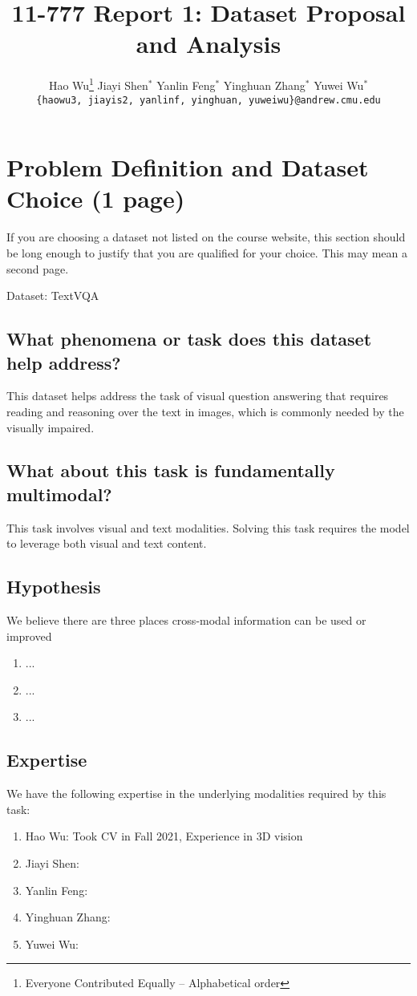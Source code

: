 \documentclass[11pt,a4paper]{article}
\title{11-777 Report 1: Dataset Proposal and Analysis}
\author{
  Hao Wu\thanks{\hspace{4pt}Everyone Contributed Equally -- Alphabetical order} \hspace{2em} Jiayi Shen$^*$ \hspace{2em} Yanlin Feng$^*$ \hspace{2em} Yinghuan Zhang$^*$ \hspace{2em} Yuwei Wu$^*$\\
  \texttt{\{haowu3, jiayis2, yanlinf, yinghuan, yuweiwu\}@andrew.cmu.edu}
  }
\date{}
\begin{document}
\maketitle

\section{Problem Definition and Dataset Choice (1 page)}
If you are choosing a dataset not listed on the course website, this section should be long enough to justify that you are qualified for your choice.  This may mean a second page.

Dataset: TextVQA


\subsection{What phenomena or task does this dataset help address?}
This dataset helps address the task of visual question answering that requires reading and reasoning over the text in images, which is commonly needed by the visually impaired.
\subsection{What about this task is fundamentally multimodal?}
This task involves visual and text modalities. Solving this task requires the model to leverage both visual and text content. 
\subsection{Hypothesis}
We believe there are three places cross-modal information can be used or improved
  \begin{enumerate}
    \item ...
    \item ...
    \item ...
  \end{enumerate}
\subsection{Expertise}
We have the following expertise in the underlying modalities required by this task:
  \begin{enumerate}
      \item Hao Wu: Took CV in Fall 2021, Experience in 3D vision
      \item Jiayi Shen: 
      \item Yanlin Feng: 
      \item Yinghuan Zhang:
      \item Yuwei Wu:
  \end{enumerate}
\end{document}
